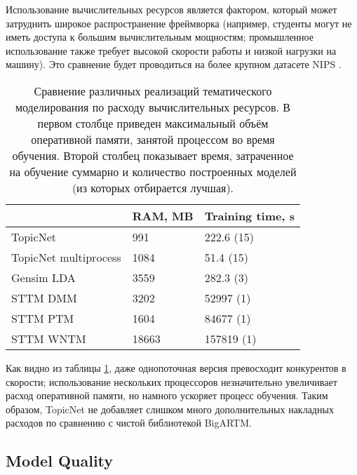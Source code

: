 Использование вычислительных ресурсов является фактором, который может затруднить широкое распространение фреймворка (например, студенты могут не иметь доступа к большим вычислительным мощностям; промышленное  использование также требует высокой скорости работы и низкой нагрузки на машину). Это сравнение будет проводиться на более крупном датасете NIPS \cite{mccallum1996bow}.  

\begin{table}[h]
\begin{tabular}{|l|l|l|}
\hline
                      & \multicolumn{1}{c|}{RAM, MB} & \multicolumn{1}{c|}{Training time, s} \\ \hline
TopicNet              & 991                         & 222.6 (15)                             \\ \hline
TopicNet multiprocess & 1084                        & 51.4 (15)                              \\ \hline
Gensim LDA            & 3559                        & 282.3 (3)                              \\ \hline
STTM DMM              & 3202                        & 52997 (1)                              \\ \hline
STTM PTM              & 1604                        & 84677 (1)                              \\ \hline
STTM WNTM             & 18663                       & 157819 (1)                             \\ \hline
\end{tabular}
\caption{Сравнение различных реализаций тематического моделирования по расходу вычислительных ресурсов. В первом столбце приведен максимальный объём оперативной памяти, занятой процессом во время обучения. Второй столбец показывает время, затраченное на обучение суммарно и количество построенных моделей (из которых отбирается лучшая).}
\label{performance-benchmark}
\end{table} 

Как видно из таблицы \ref{performance-benchmark}, даже однопоточная версия превосходит конкурентов в скорости; использование нескольких процессоров незначительно увеличивает расход оперативной памяти, но намного ускоряет процесс обучения. Таким образом, TopicNet не добавляет слишком много дополнительных накладных расходов по сравнению с чистой библиотекой BigARTM.  

\subsection{Model Quality} 

